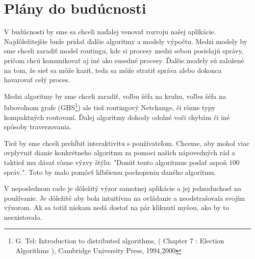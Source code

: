 \section{Plány do budúcnosti}

V budúcnosti by sme sa chceli naďalej venovať rozvoju našej aplikácie. Najdôležitejšie bude pridať
ďalšie algoritmy a modely výpočtu. Medzi modely by sme chceli zaradiť model routingu, kde si procesy
medzi sebou posielajú správy, pričom chcú komunikovať aj iné ako susedné procesy. Ďalšie modely sú
založené na tom, že sieť sa môže kaziť, teda sa môže stratiť správa alebo dokonca havarovať celý
proces.

Medzi algoritmy by sme chceli zaradiť, voľbu šéfa na kruhu, voľbu šéfa na ľubovoľnom grafe
(GHS\footnote{G. Tel: Introduction to distributed algorithms, ( Chapter 7 : Election Algorithms ),
Cambridge University Press, 1994,2000}) ale
tiež routingový Netchange, či rôzne typy kompaktných routovaní. Ďalej algoritmy dohody odolné voči
chybám či iné spôsoby traverzovania.

Tiež by sme chceli prehĺbiť interaktivitu s používateľom. Chceme, aby mohol viac ovplyvniť dianie
konkrétneho algoritmu za pomoci našich nápovedných rád a taktiež mu dávať rôzne výzvy štýlu: "Donúť
tento algoritmus poslať aspoň $100$ správ.". Toto by malo pomôcť hlbšiemu pochopeniu daného
algoritmu.

V neposlednom rade je dôležitý výzor samotnej aplikácie a jej jednoduchosť na používanie. Je
dôležité aby bola intuitívna na ovládanie a neodstrašovala svojím výzorom. Ak sa totiž niekam nedá
dostať na pár kliknutí myšou, ako by to neexistovalo.
